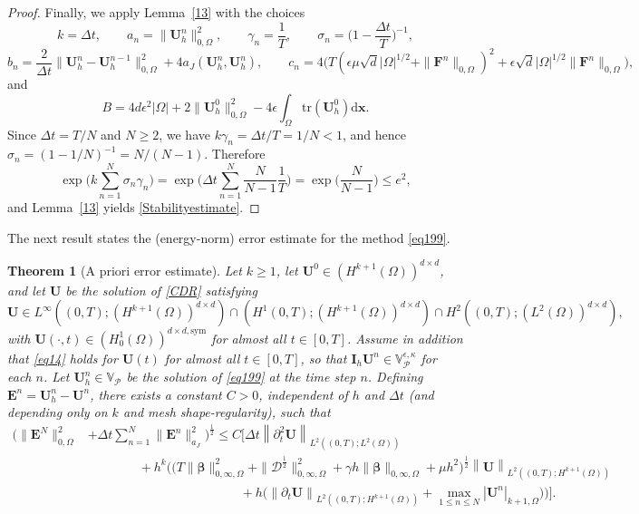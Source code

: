 \documentclass[final,12pt]{amsart}
\theoremstyle{plain}
\newtheorem{theorem}{Theorem}[section]
\theoremstyle{definition}
\newcommand\bx{\boldsymbol{x}}
\newcommand\bbeta{{\boldsymbol{\beta}}}
\newcommand\calP{{\mathcal{P}}}
\newcommand\bU{\mathbf{U}}
\newcommand\bE{\mathbf{E}}
\begin{document}
\begin{proof}
Finally, we apply Lemma~\ref{13} with the choices
\[
	k=\Delta t,\qquad
	a_n=\|\bU_h^n\|_{0,\Omega}^2,\qquad
	\gamma_n=\frac{1}{T},\qquad
	\sigma_n=\Big(1-\frac{\Delta t}{T}\Big)^{-1},
\]
\[
	b_n=\frac{2}{\Delta t}\|\bU_h^n-\bU_h^{n-1}\|_{0,\Omega}^2+4 a_J(\bU_h^n,\bU_h^n),\qquad
	c_n=4\Big(T(\epsilon\mu \sqrt{d}|\Omega|^{1/2}+\|\mathbf F^n\|_{0,\Omega})^2+\epsilon\sqrt{d}|\Omega|^{1/2}\|\mathbf F^n\|_{0,\Omega}\Big),
\]
and
\[
	B=4d\epsilon^{2}\lvert \Omega \rvert
	+2\|\mathbf{U}_{h}^{0}\|_{0,\Omega}^{2}
	-4\epsilon\int_\Omega\mathrm{tr}(\mathbf{U}_{h}^{0}) \mathrm{d}\bx.
\]
Since $\Delta t=T/N$ and $N\ge 2$, we have $k\gamma_n=\Delta t/T=1/N<1$, and hence $\sigma_n=(1-1/N)^{-1}=N/(N-1)$. Therefore
\[
	\exp\Big(k\sum_{n=1}^{N}\sigma_n\gamma_n\Big)
	=\exp\Big(\Delta t\sum_{n=1}^{N}\frac{N}{N-1} \frac{1}{T}\Big)
	=\exp\Big(\frac{N}{N-1}\Big)
	\le e^{2} ,
\]
and Lemma~\ref{13} yields \eqref{Stabilityestimate}.
\end{proof}

The next result states the (energy-norm) error estimate for the method \eqref{eq199}.

\begin{theorem}[A priori error estimate]
  \label{Theorem11}
	Let $k\ge 1$, let $\bU^{0}\in \left(H^{k+1}(\Omega)\right)^{d\times d}$, and let $\bU$ be the solution of \eqref{CDR} satisfying
	\[
	\bU\in  L^{\infty}((0,T);(H^{k+1}(\Omega))^{d\times d})\cap (H^{1}(0,T);(H^{k+1}(\Omega))^{d\times d})\cap H^{2}((0,T);(L^{2}(\Omega))^{d\times d}),
	\]
	with $\bU(\cdot,t)\in (H^{1}_{0}(\Omega))^{d\times d,\textrm{sym}}$ for almost all $t\in [0,T]$.
	Assume in addition that \eqref{eq14} holds for $\bU(t)$ for almost all $t\in[0,T]$, so that $\mathbf I_h\bU^n\in\mathbb V_{\calP}^{\epsilon,\kappa}$ for each $n$.
	Let $\bU_{h}^{n}\in \mathbb{V}_{\calP}$ be the solution of \eqref{eq199} 
	at the time step $n$.
	Defining $\bE^{n}=\bU^{n}_{h}-\bU^{n}$, there exists a constant $C>0$,  independent of $h$ and $\Delta t$ (and depending only on $k$ and mesh shape-regularity), such that
\begin{equation}
	\begin{aligned}
		\Big( \|\bE^N \|_{0,\Omega}^2&+\Delta t\sum_{n=1}^{N}\|\bE^n \|_{a_{J}}^2 \Big)^{\frac{1}{2}}
		\leq C\Bigg[ \Delta t \left\|	\partial_{t}^{2}\mathbf{U} \right\|_{L^{2}((0,T);L^{2}(\Omega))} \\
		&\qquad\qquad+ h^{k}\Big(\big(T\|\bbeta\|_{0,\infty,\Omega}^{2}+\|\mathcal{D}^{\frac{1}{2}}\|_{0,\infty,\Omega}^{2}+\gamma h\|\bbeta\|_{0,\infty,\Omega}+\mu h^{2}\big)^{\frac{1}{2}}
		\left\|	\mathbf{U} \right\|_{L^{2}((0,T);H^{k+1}(\Omega))}\\
			&\qquad\qquad\qquad\qquad\qquad\qquad
			+h\Big(\left\|\partial_{t}\mathbf{U} \right\|_{L^{2}((0,T);H^{k+1}(\Omega))}+ \max\limits_{1\leq n\leq N}|\bU^{n} |_{k+1,\Omega}\Big)\Big)\Bigg].
	\end{aligned}
\end{equation}
\end{theorem}
\end{document}
